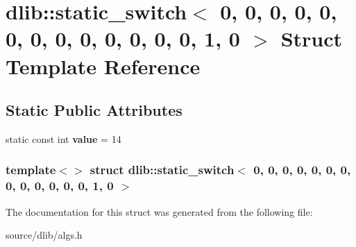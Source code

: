 \hypertarget{structdlib_1_1static__switch_3_010_00_010_00_010_00_010_00_010_00_010_00_010_00_010_00_010_00_016cef4822784544663fb033f63ec96728}{
\section{dlib::static\_\-switch$<$ 0, 0, 0, 0, 0, 0, 0, 0, 0, 0, 0, 0, 0, 1, 0 $>$ Struct Template Reference}
\label{structdlib_1_1static__switch_3_010_00_010_00_010_00_010_00_010_00_010_00_010_00_010_00_010_00_016cef4822784544663fb033f63ec96728}
}
\subsection*{Static Public Attributes}
\begin{DoxyCompactItemize}
\item 
\hypertarget{structdlib_1_1static__switch_3_010_00_010_00_010_00_010_00_010_00_010_00_010_00_010_00_010_00_016cef4822784544663fb033f63ec96728_af4791171a90f6cf2f3f5db2907418ea1}{
static const int {\bfseries value} = 14}
\label{structdlib_1_1static__switch_3_010_00_010_00_010_00_010_00_010_00_010_00_010_00_010_00_010_00_016cef4822784544663fb033f63ec96728_af4791171a90f6cf2f3f5db2907418ea1}

\end{DoxyCompactItemize}
\subsubsection*{template$<$$>$ struct dlib::static\_\-switch$<$ 0, 0, 0, 0, 0, 0, 0, 0, 0, 0, 0, 0, 0, 1, 0 $>$}



The documentation for this struct was generated from the following file:\begin{DoxyCompactItemize}
\item 
source/dlib/algs.h\end{DoxyCompactItemize}
